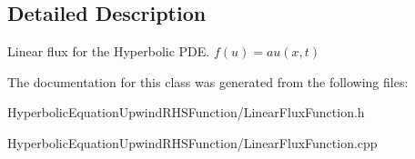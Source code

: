 \subsection{Detailed Description}
Linear flux for the Hyperbolic PDE. $ f(u) = au(x,t) $ 

The documentation for this class was generated from the following files:\begin{DoxyCompactItemize}
\item 
HyperbolicEquationUpwindRHSFunction/LinearFluxFunction.h\item 
HyperbolicEquationUpwindRHSFunction/LinearFluxFunction.cpp\end{DoxyCompactItemize}
